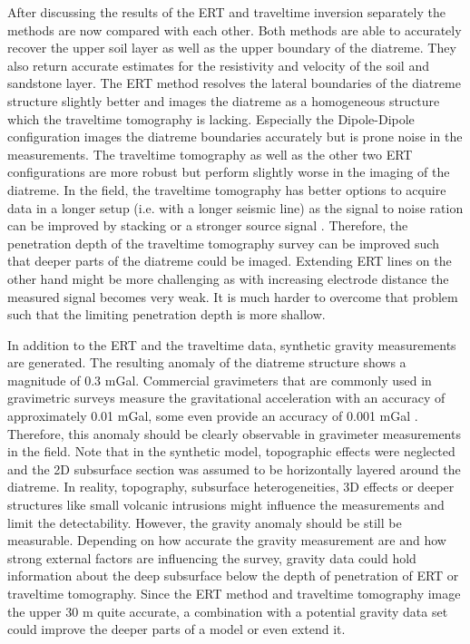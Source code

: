 After discussing the results of the ERT and traveltime inversion separately the methods are now compared with each other. Both methods are able to accurately recover the upper soil layer as well as the upper boundary of the diatreme. They also return accurate estimates for the resistivity and velocity of the soil and sandstone layer. The ERT method resolves the lateral boundaries of the diatreme structure slightly better and images the diatreme as a homogeneous structure which the traveltime tomography is lacking. Especially the Dipole-Dipole configuration images the diatreme boundaries accurately but is prone noise in the measurements. The traveltime tomography as well as the other two ERT configurations are more robust but perform slightly worse in the imaging of the diatreme. In the field, the traveltime tomography has better options to acquire data in a longer setup (i.e. with a longer seismic line) as the signal to noise ration can be improved by stacking or a stronger source signal \citep{kearey2002introduction}. Therefore, the penetration depth of the traveltime tomography survey can be improved such that deeper parts of the diatreme could be imaged. Extending ERT lines on the other hand might be more challenging as with increasing electrode distance the measured signal becomes very weak.  It is much harder to overcome that problem such that the limiting penetration depth is more shallow.  

In addition to the ERT and the traveltime data, synthetic gravity measurements are generated. The resulting anomaly of the diatreme structure shows a magnitude of 0.3 mGal. Commercial gravimeters that are commonly used in gravimetric surveys measure the gravitational acceleration with an accuracy of approximately 0.01 mGal, some even provide an accuracy of 0.001 mGal \citep{BGR_grav}. Therefore, this anomaly should be clearly observable in gravimeter measurements in the field. Note that in the synthetic model, topographic effects were neglected and the 2D subsurface section was assumed to be horizontally layered around the diatreme. In reality, topography, subsurface heterogeneities, 3D effects or deeper structures like small volcanic intrusions might influence the measurements and limit the detectability. However, the gravity anomaly should be still be measurable. Depending on how accurate the gravity measurement are and how strong external factors are influencing the survey, gravity data could hold information about the deep subsurface below the depth of penetration of ERT or traveltime tomography. Since the ERT method and traveltime tomography image the upper 30 m quite accurate, a combination with a potential gravity data set could improve the deeper parts of a model or even extend it.
